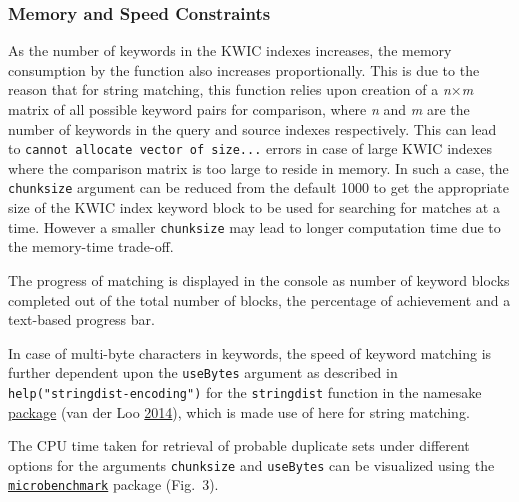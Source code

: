 \documentclass[]{article}
\begin{document}
\hypertarget{memory-and-speed-constraints}{%
\subsubsection{Memory and Speed
Constraints}\label{memory-and-speed-constraints}}

As the number of keywords in the KWIC indexes increases, the memory
consumption by the function also increases proportionally. This is due
to the reason that for string matching, this function relies upon
creation of a \emph{n}\(\times\)\emph{m} matrix of all possible keyword
pairs for comparison, where \emph{n} and \emph{m} are the number of
keywords in the query and source indexes respectively. This can lead to
\texttt{cannot\ allocate\ vector\ of\ size...} errors in case of large
KWIC indexes where the comparison matrix is too large to reside in
memory. In such a case, the \texttt{chunksize} argument can be reduced
from the default 1000 to get the appropriate size of the KWIC index
keyword block to be used for searching for matches at a time. However a
smaller \texttt{chunksize} may lead to longer computation time due to
the memory-time trade-off.

The progress of matching is displayed in the console as number of
keyword blocks completed out of the total number of blocks, the
percentage of achievement and a text-based progress bar.

In case of multi-byte characters in keywords, the speed of keyword
matching is further dependent upon the \texttt{useBytes} argument as
described in \texttt{help("stringdist-encoding")} for the
\texttt{stringdist} function in the namesake
\href{https://CRAN.R-project.org/package=stringdist}{package} (van der
Loo \protect\hyperlink{ref-van2014stringdist}{2014}), which is made use
of here for string matching.

The CPU time taken for retrieval of probable duplicate sets under
different options for the arguments \texttt{chunksize} and
\texttt{useBytes} can be visualized using the
\href{https://CRAN.R-project.org/package=microbenchmark}{\texttt{microbenchmark}}
package (Fig.~3).
\end{document}
